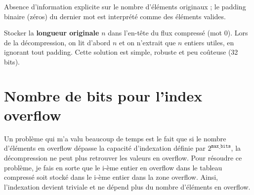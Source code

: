 \documentclass{rapportClass} %
\begin{document}
Absence d'information explicite sur le nombre d'éléments originaux ; le padding binaire (zéros) du dernier mot
est interprété comme des éléments valides.

Stocker la \textbf{longueur originale} $n$ dans l'en-tête du flux compressé (mot 0). Lors de la décompression,
on lit d'abord $n$ et on n'extrait que $n$ entiers utiles, en ignorant tout padding. Cette solution est simple,
robuste et peu coûteuse (32 bits).

\section{Nombre de bits pour l'index overflow}
Un problème qui m'a valu beaucoup de temps est le fait que si le nombre d'éléments en overflow dépasse
la capacité d'indexation définie par $2^{\texttt{max\_bits}}$, la décompression ne peut plus retrouver les valeurs en overflow.
Pour résoudre ce problème, je fais en sorte que le i-ème entier en overflow dans le tableau compressé soit stocké dans le i-ème entier dans la zone overflow.
Ainsi, l'indexation devient triviale et ne dépend plus du nombre d'éléments en overflow.
\end{document}
